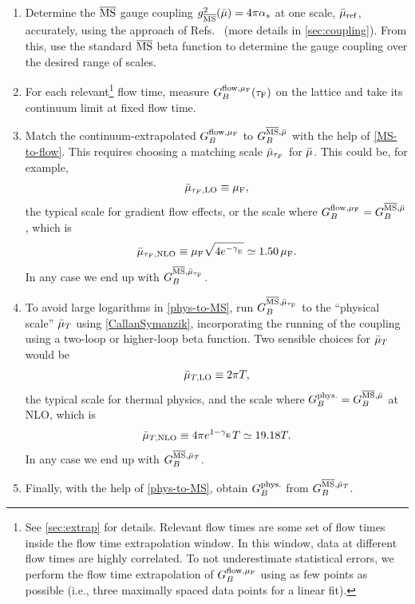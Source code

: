 \documentclass[floatfix,twocolumn,prd,showpacs,preprintnumbers,amsmath,nofootinbib,amssymb,superscriptaddress]{revtex4-2}
\def\ccites#1{Refs.~\cite{#1}} %
\begin{document}
\begin{enumerate}
\label{recipes}
    \item \label{item1} Determine the $\overline{\text{MS}}$ gauge coupling $g^2_{\overline{\text{MS}}}(\bar{\mu})=4 \pi \alpha_s$ at one scale, $\bar{\mu}_\mathrm{ref}$, accurately, using the approach of 
    \ccites{Luscher:2010iy,Harlander:2016vzb} (more details in \cref{sec:coupling}).
    From this, use the standard $\overline{\text{MS}}$ beta function to determine the gauge coupling over the desired range of scales.
    \item \label{item2} For each relevant\footnote{See \cref{sec:extrap} for details. Relevant flow times are some set of flow times inside the flow time extrapolation window. In this window, data at different flow times are highly correlated. To not underestimate statistical errors, we perform the flow time extrapolation of $G_{B}^{\mathrm{flow}, \mu_\mathrm{F}}$ using as few points as possible (i.e., three maximally spaced data points for a linear fit).} flow time, measure $G_{B}^{\mathrm{flow}, \mu_\mathrm{F}}(\tau_\mathrm{F})$ on the lattice and take its continuum limit at fixed flow time.
    \item \label{item3} Match the continuum-extrapolated $G_{B}^{\mathrm{flow}, \mu_\mathrm{F}}$ to  $G_{B}^{\overline{\text{MS}},\bar{\mu}}$ with the help of \cref{MS-to-flow}.
    This requires choosing a matching scale $\bar{\mu}_{\tau_F}$ for $\bar{\mu}$. 
    This could be, for example, 
    \begin{align}
        \bar{\mu}_{\tau_F,\mathrm{LO}} \equiv \mu_\mathrm{F},
    \end{align} the typical scale for gradient flow effects, or the scale where $G_{B}^{\mathrm{flow}, \mu_\mathrm{F}}=G_{B}^{\overline{\text{MS}},\bar{\mu}}$, which is 
    \begin{align}
    \bar{\mu}_{\tau_F,\mathrm{NLO}} \equiv \mu_\mathrm{F} \sqrt{4e^{-\gamma_{_{\mathrm{E}}}}} \simeq 1.50\,\mu_\mathrm{F}.
    \end{align}In any case we end up with $G_{B}^{\overline{\text{MS}},\bar{\mu}_{\tau_\mathrm{F}}}$.
    \item \label{item4}
    To avoid large logarithms in \cref{phys-to-MS}, run $G_{B}^{\overline{\text{MS}},\bar{\mu}_{\tau_\mathrm{F}}}$ to the ``physical scale'' $\bar{\mu}_{T}$ using \cref{CallanSymanzik}, incorporating the running of the coupling using a two-loop or higher-loop beta function.
    Two sensible choices for $\bar{\mu}_{T}$ would be 
    \begin{align}
        \bar{\mu}_{T,\mathrm{LO}} \equiv 2\pi T,
    \end{align} the typical scale for thermal physics, and the scale where $G_B^{\text{phys.}}=G_{B}^{\overline{\text{MS}},\bar{\mu}}$ at NLO, which is 
    \begin{align}
        \bar{\mu}_{T,\mathrm{NLO}} \equiv 4\pi e^{1-\gamma_{_{\mathrm{E}}}} T \simeq 19.18 T.
    \end{align} In any case we end up with $G_{B}^{\overline{\text{MS}},\bar{\mu}_T}$.
    \item \label{item5}
    Finally, with the help of \cref{phys-to-MS}, obtain $G_B^{\text{phys.}}$ from $G_{B}^{\overline{\text{MS}},\bar{\mu}_T}$.
\end{enumerate}
\end{document}
